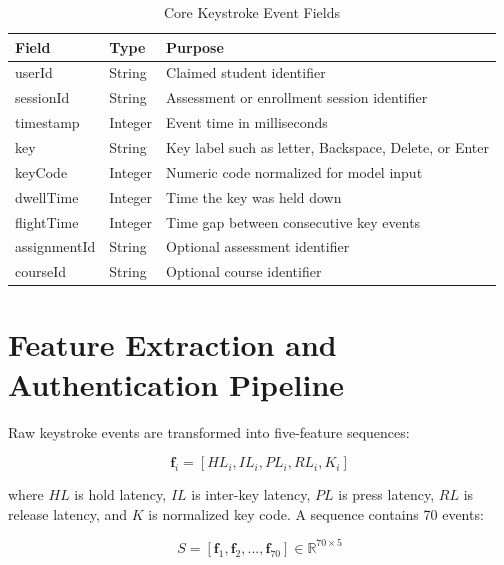 \begin{table}[H]
  \centering
  \caption{Core Keystroke Event Fields}
  \label{tab:event-schema}
  \begin{singlespace}
  \begin{tabularx}{\textwidth}{@{}p{3.0cm}p{2.2cm}p{8.0cm}@{}}
    \toprule
    \textbf{Field} & \textbf{Type} & \textbf{Purpose} \\
    \midrule
    userId & String & Claimed student identifier \\
    sessionId & String & Assessment or enrollment session identifier \\
    timestamp & Integer & Event time in milliseconds \\
    key & String & Key label such as letter, Backspace, Delete, or Enter \\
    keyCode & Integer & Numeric code normalized for model input \\
    dwellTime & Integer & Time the key was held down \\
    flightTime & Integer & Time gap between consecutive key events \\
    assignmentId & String & Optional assessment identifier \\
    courseId & String & Optional course identifier \\
    \bottomrule
  \end{tabularx}
  \end{singlespace}
\end{table}

\section{Feature Extraction and Authentication Pipeline}
\label{sec:feature-pipeline}

Raw keystroke events are transformed into five-feature sequences:

\begin{equation}
\mathbf{f}_i = [HL_i, IL_i, PL_i, RL_i, K_i]
\end{equation}

where $HL$ is hold latency, $IL$ is inter-key latency, $PL$ is press latency, $RL$ is release latency, and $K$ is normalized key code. A sequence contains 70 events:

\begin{equation}
S = [\mathbf{f}_1, \mathbf{f}_2, ..., \mathbf{f}_{70}] \in \mathbb{R}^{70 \times 5}
\end{equation}

